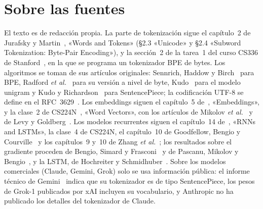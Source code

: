 \documentclass[11pt,a4paper,twoside,openany]{book}
\begin{document}
\section*{Sobre las fuentes}
El texto es de redacción propia. La parte de tokenización sigue el capítulo~2 de Jurafsky y Martin~\cite{jm3}, «Words and Tokens» (§2.3 «Unicode» y §2.4 «Subword Tokenization: Byte-Pair Encoding»), y la sección~2 de la tarea~1 del curso CS336 de Stanford~\cite{cs336}, en la que se programa un tokenizador BPE de bytes. Los algoritmos se toman de sus artículos originales: Sennrich, Haddow y Birch~\cite{sennrich} para BPE, Radford \emph{et al.}~\cite{gpt2} para su versión a nivel de byte, Kudo~\cite{kudo} para el modelo unigram y Kudo y Richardson~\cite{sentencepiece} para SentencePiece; la codificación UTF-8 se define en el RFC~3629~\cite{rfc3629}. Los embeddings siguen el capítulo~5 de~\cite{jm3}, «Embeddings», y la clase~2 de CS224N~\cite{cs224n}, «Word Vectors», con los artículos de Mikolov \emph{et al.}~\cite{mikolov13a,mikolov13b} y de Levy y Goldberg~\cite{levy}. Los modelos recurrentes siguen el capítulo~14 de~\cite{jm3}, «RNNs and LSTMs», la clase~4 de CS224N, el capítulo~10 de Goodfellow, Bengio y Courville~\cite{gbc} y los capítulos~9 y~10 de Zhang \emph{et al.}~\cite{d2l}; los resultados sobre el gradiente proceden de Bengio, Simard y Frasconi~\cite{bengio94} y de Pascanu, Mikolov y Bengio~\cite{pascanu}, y la LSTM, de Hochreiter y Schmidhuber~\cite{lstm}. Sobre los modelos comerciales (Claude, Gemini, Grok) solo se usa información pública: el informe técnico de Gemini~\cite{gemini} indica que su tokenizador es de tipo SentencePiece, los pesos de Grok-1 publicados por xAI incluyen su vocabulario, y Anthropic no ha publicado los detalles del tokenizador de Claude.
\end{document}
